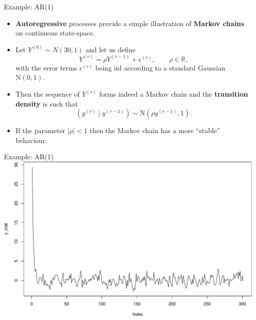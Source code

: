 \documentclass[
  9pt,
  ignorenonframetext,
]{beamer}
\begin{document}
\begin{frame}{Example: AR(1)}
\protect\hypertarget{example-ar1}{}
\begin{itemize}
\item
  \textbf{Autoregressive} processes provide a simple illustration of
  \textbf{Markov chains} on continuous state-space.
\item
  Let \(Y^{(0)} \sim N(30, 1)\) and let us define \[
  Y^{(r)} = \rho Y^{(r-1)} + \epsilon^{(r)}, \qquad \rho \in \mathbb{R},
  \] with the error terms \(\epsilon^{(r)}\) being iid according to a
  standard Gaussian \(\text{N}(0,1)\).
\item
  Then the sequence of \(Y^{(r)}\) forms indeed a Markov chain and the
  \textbf{transition density} is such that \[
  (y^{(r)} \mid y^{(r-1)})  \sim \text{N}(\rho y^{(r-1)}, 1).
  \]
\item
  If the parameter \(|\rho| < 1\) then the Markov chain has a more
  ``stable'' behaviour.
\end{itemize}
\end{frame}

\begin{frame}{Example: AR(1)}
\protect\hypertarget{example-ar1-1}{}
\includegraphics{un_A1_files/figure-beamer/unnamed-chunk-1-1.pdf}
\end{frame}
\end{document}
